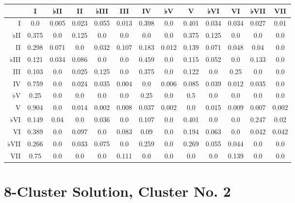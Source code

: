 \begin{table}[htbp]
\begin{minipage}{\linewidth}
\setlength{\tymax}{0.5\linewidth}
\centering
\small
\begin{tabulary}{\textwidth}{@{}RCCCCCCCCCCCC@{}} \toprule
&I&♭II&II&♭III&III&IV&♭V&V&♭VI&VI&♭VII&VII\\
\midrule
I&0.0&0.005&0.023&0.055&0.013&0.398&0.0&0.401&0.034&0.034&0.027&0.01\\
♭II&0.375&0.0&0.125&0.0&0.0&0.0&0.0&0.375&0.125&0.0&0.0&0.0\\
II&0.298&0.071&0.0&0.032&0.107&0.183&0.012&0.139&0.071&0.048&0.04&0.0\\
♭III&0.121&0.034&0.086&0.0&0.0&0.459&0.0&0.115&0.052&0.0&0.133&0.0\\
III&0.103&0.0&0.025&0.125&0.0&0.375&0.0&0.122&0.0&0.25&0.0&0.0\\
IV&0.759&0.0&0.024&0.035&0.004&0.0&0.006&0.085&0.039&0.012&0.035&0.0\\
♭V&0.25&0.0&0.0&0.0&0.0&0.25&0.0&0.5&0.0&0.0&0.0&0.0\\
V&0.904&0.0&0.014&0.002&0.008&0.037&0.002&0.0&0.015&0.009&0.007&0.002\\
♭VI&0.149&0.04&0.0&0.036&0.0&0.107&0.0&0.401&0.0&0.0&0.247&0.02\\
VI&0.389&0.0&0.097&0.0&0.083&0.09&0.0&0.194&0.063&0.0&0.042&0.042\\
♭VII&0.266&0.0&0.033&0.075&0.0&0.259&0.0&0.269&0.055&0.044&0.0&0.0\\
VII&0.75&0.0&0.0&0.0&0.111&0.0&0.0&0.0&0.0&0.139&0.0&0.0\\

\bottomrule

\end{tabulary}
\end{minipage}
\end{table}

\section{8-Cluster Solution, Cluster No. 2}
\label{8-clustersolutionclusterno.2}

